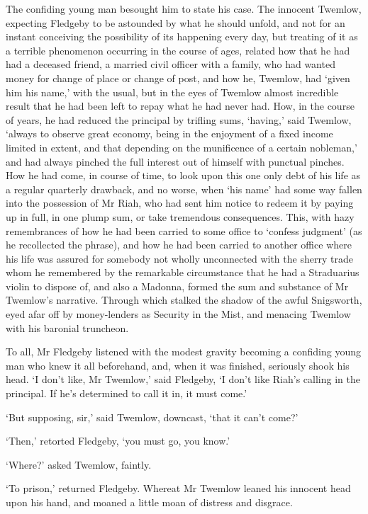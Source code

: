 The confiding young man besought him to state his case. The innocent
Twemlow, expecting Fledgeby to be astounded by what he should unfold,
and not for an instant conceiving the possibility of its happening every
day, but treating of it as a terrible phenomenon occurring in the course
of ages, related how that he had had a deceased friend, a married civil
officer with a family, who had wanted money for change of place or
change of post, and how he, Twemlow, had ‘given him his name,’ with the
usual, but in the eyes of Twemlow almost incredible result that he had
been left to repay what he had never had. How, in the course of years,
he had reduced the principal by trifling sums, ‘having,’ said Twemlow,
‘always to observe great economy, being in the enjoyment of a fixed
income limited in extent, and that depending on the munificence of
a certain nobleman,’ and had always pinched the full interest out of
himself with punctual pinches. How he had come, in course of time,
to look upon this one only debt of his life as a regular quarterly
drawback, and no worse, when ‘his name’ had some way fallen into the
possession of Mr Riah, who had sent him notice to redeem it by paying up
in full, in one plump sum, or take tremendous consequences. This, with
hazy remembrances of how he had been carried to some office to ‘confess
judgment’ (as he recollected the phrase), and how he had been carried
to another office where his life was assured for somebody not wholly
unconnected with the sherry trade whom he remembered by the remarkable
circumstance that he had a Straduarius violin to dispose of, and also a
Madonna, formed the sum and substance of Mr Twemlow’s narrative. Through
which stalked the shadow of the awful Snigsworth, eyed afar off by
money-lenders as Security in the Mist, and menacing Twemlow with his
baronial truncheon.

To all, Mr Fledgeby listened with the modest gravity becoming a
confiding young man who knew it all beforehand, and, when it was
finished, seriously shook his head. ‘I don’t like, Mr Twemlow,’ said
Fledgeby, ‘I don’t like Riah’s calling in the principal. If he’s
determined to call it in, it must come.’

‘But supposing, sir,’ said Twemlow, downcast, ‘that it can’t come?’

‘Then,’ retorted Fledgeby, ‘you must go, you know.’

‘Where?’ asked Twemlow, faintly.

‘To prison,’ returned Fledgeby. Whereat Mr Twemlow leaned his innocent
head upon his hand, and moaned a little moan of distress and disgrace.

